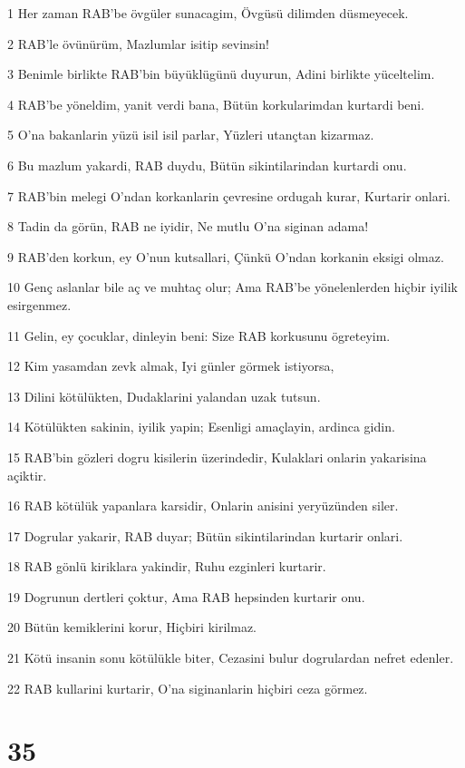 \par 1 Her zaman RAB'be övgüler sunacagim, Övgüsü dilimden düsmeyecek.
\par 2 RAB'le övünürüm, Mazlumlar isitip sevinsin!
\par 3 Benimle birlikte RAB'bin büyüklügünü duyurun, Adini birlikte yüceltelim.
\par 4 RAB'be yöneldim, yanit verdi bana, Bütün korkularimdan kurtardi beni.
\par 5 O'na bakanlarin yüzü isil isil parlar, Yüzleri utançtan kizarmaz.
\par 6 Bu mazlum yakardi, RAB duydu, Bütün sikintilarindan kurtardi onu.
\par 7 RAB'bin melegi O'ndan korkanlarin çevresine ordugah kurar, Kurtarir onlari.
\par 8 Tadin da görün, RAB ne iyidir, Ne mutlu O'na siginan adama!
\par 9 RAB'den korkun, ey O'nun kutsallari, Çünkü O'ndan korkanin eksigi olmaz.
\par 10 Genç aslanlar bile aç ve muhtaç olur; Ama RAB'be yönelenlerden hiçbir iyilik esirgenmez.
\par 11 Gelin, ey çocuklar, dinleyin beni: Size RAB korkusunu ögreteyim.
\par 12 Kim yasamdan zevk almak, Iyi günler görmek istiyorsa,
\par 13 Dilini kötülükten, Dudaklarini yalandan uzak tutsun.
\par 14 Kötülükten sakinin, iyilik yapin; Esenligi amaçlayin, ardinca gidin.
\par 15 RAB'bin gözleri dogru kisilerin üzerindedir, Kulaklari onlarin yakarisina açiktir.
\par 16 RAB kötülük yapanlara karsidir, Onlarin anisini yeryüzünden siler.
\par 17 Dogrular yakarir, RAB duyar; Bütün sikintilarindan kurtarir onlari.
\par 18 RAB gönlü kiriklara yakindir, Ruhu ezginleri kurtarir.
\par 19 Dogrunun dertleri çoktur, Ama RAB hepsinden kurtarir onu.
\par 20 Bütün kemiklerini korur, Hiçbiri kirilmaz.
\par 21 Kötü insanin sonu kötülükle biter, Cezasini bulur dogrulardan nefret edenler.
\par 22 RAB kullarini kurtarir, O'na siginanlarin hiçbiri ceza görmez.

\chapter{35}

